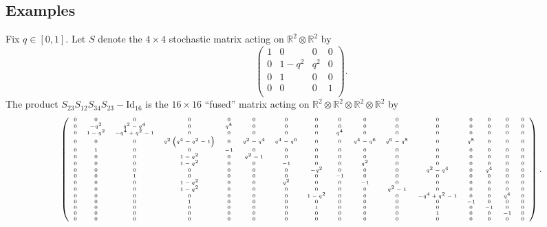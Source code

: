 \documentclass[12pt]{ximera}
\begin{document}
\subsection{Examples}
Fix $q \in [0,1]$. Let $S$ denote the $4\times 4$ stochastic matrix acting on $\mathbb{R}^2 \otimes \mathbb{R}^2$ by 
$$
\left(
\begin{array}{cccc}
 1 & 0 & 0 & 0 \\
 0 & 1-q^2 & q^2 & 0 \\
 0 & 1 & 0 & 0 \\
 0 & 0 & 0 & 1 \\
\end{array}
\right).
$$
The product $S_{23}S_{12}S_{34}S_{23}-\mathrm{Id}_{16}$ is the $16\times 16$ ``fused'' matrix acting on $\mathbb{R}^2 \otimes \mathbb{R}^2 \otimes \mathbb{R}^2 \otimes \mathbb{R}^2 $ by 
$$
\tiny
\left(
\begin{array}{cccccccccccccccc}
 0 & 0 & 0 & 0 & 0 & 0 & 0 & 0 & 0 & 0 & 0 & 0 & 0 & 0 & 0 & 0 \\
 0 & -q^2 & q^2-q^4 & 0 & q^4 & 0 & 0 & 0 & 0 & 0 & 0 & 0 & 0 & 0 & 0 & 0 \\
 0 & 1-q^2 & -q^4+q^2-1 & 0 & 0 & 0 & 0 & 0 & q^4 & 0 & 0 & 0 & 0 & 0 & 0 & 0 \\
 0 & 0 & 0 & q^2 \left(q^4-q^2-1\right) & 0 & q^2-q^4 & q^4-q^6 & 0 & 0 & q^4-q^6 &
   q^6-q^8 & 0 & q^8 & 0 & 0 & 0 \\
 0 & 1 & 0 & 0 & -1 & 0 & 0 & 0 & 0 & 0 & 0 & 0 & 0 & 0 & 0 & 0 \\
 0 & 0 & 0 & 1-q^2 & 0 & q^2-1 & 0 & 0 & 0 & 0 & 0 & 0 & 0 & 0 & 0 & 0 \\
 0 & 0 & 0 & 1-q^2 & 0 & 0 & -1 & 0 & 0 & q^2 & 0 & 0 & 0 & 0 & 0 & 0 \\
 0 & 0 & 0 & 0 & 0 & 0 & 0 & -q^2 & 0 & 0 & 0 & q^2-q^4 & 0 & q^4 & 0 & 0 \\
 0 & 0 & 1 & 0 & 0 & 0 & 0 & 0 & -1 & 0 & 0 & 0 & 0 & 0 & 0 & 0 \\
 0 & 0 & 0 & 1-q^2 & 0 & 0 & q^2 & 0 & 0 & -1 & 0 & 0 & 0 & 0 & 0 & 0 \\
 0 & 0 & 0 & 1-q^2 & 0 & 0 & 0 & 0 & 0 & 0 & q^2-1 & 0 & 0 & 0 & 0 & 0 \\
 0 & 0 & 0 & 0 & 0 & 0 & 0 & 1-q^2 & 0 & 0 & 0 & -q^4+q^2-1 & 0 & 0 & q^4 & 0 \\
 0 & 0 & 0 & 1 & 0 & 0 & 0 & 0 & 0 & 0 & 0 & 0 & -1 & 0 & 0 & 0 \\
 0 & 0 & 0 & 0 & 0 & 0 & 0 & 1 & 0 & 0 & 0 & 0 & 0 & -1 & 0 & 0 \\
 0 & 0 & 0 & 0 & 0 & 0 & 0 & 0 & 0 & 0 & 0 & 1 & 0 & 0 & -1 & 0 \\
 0 & 0 & 0 & 0 & 0 & 0 & 0 & 0 & 0 & 0 & 0 & 0 & 0 & 0 & 0 & 0 \\
\end{array}
\right).
$$
\end{document}
